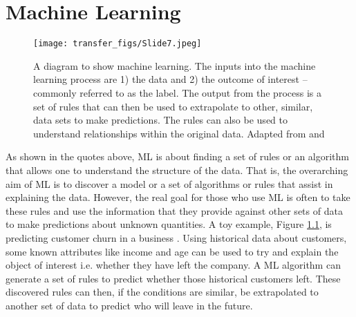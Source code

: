 
\chapter{Machine Learning}

\begin{figure}
  \texttt{[image: transfer\_figs/Slide7.jpeg]}
  \caption[Machine learning diagram.]{A diagram to show machine learning. The inputs into the machine learning process are 1) the data and 2) the outcome of interest – commonly referred to as the label. The output from the process is a set of rules that can then be used to extrapolate to other, similar, data sets to make predictions. The rules can also be used to understand relationships within the original data.  Adapted from  \textcite{chollet_allaire_2018} and \textcite{provost2013data} }
  \label{fig:ML}
\end{figure}


 \parencite{spiegelhalter2019art}

 \parencite{chollet_allaire_2018}


As shown in the quotes above, ML is about finding a set of rules or an algorithm that allows one to understand the structure of the data. That is, the overarching aim of ML is to discover a model or a set of algorithms or rules that assist in explaining the data. However, the real goal for those who use ML is often to take these rules and use the information that they provide against other sets of data to make predictions about unknown quantities. A toy example, Figure \ref{fig:ML},  is predicting customer churn in a business \parencite{provost2013data}. Using historical data about customers, some known attributes like income and age can be used to try and explain the object of interest i.e. whether they have left the company. A ML algorithm can generate a set of rules to predict whether those historical customers left. These discovered rules can then, if the conditions are similar, be extrapolated to another set of data to predict who will leave in the future.

